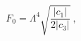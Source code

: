 \begin{equation}
  \label{eq:phi4min}
  F_0 = \Lambda^4 \sqrt{\frac{|c_1|}{2 |c_3|}}\ ,
\end{equation}

